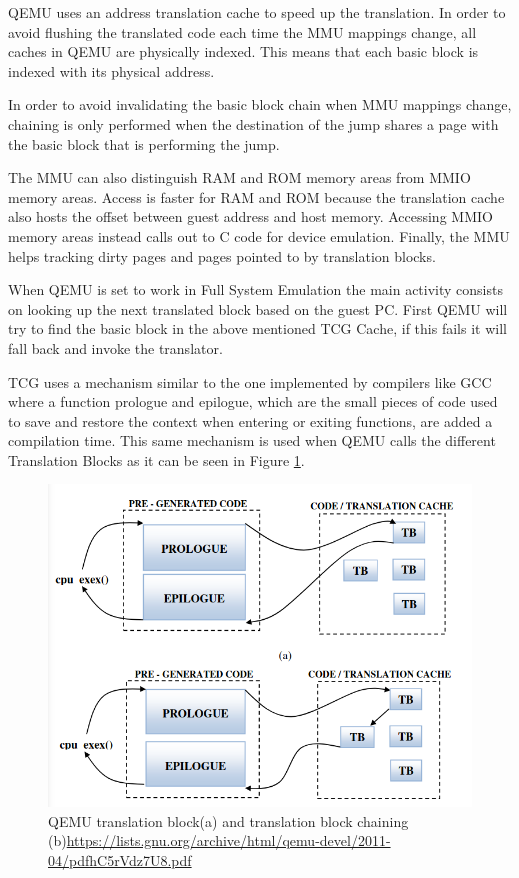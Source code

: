 \begin{itemize}
    QEMU uses an address translation cache to speed up the translation. In order to avoid flushing the translated code each time the MMU mappings change, all caches in QEMU are physically indexed. This means that each basic block is indexed with its physical address.

    In order to avoid invalidating the basic block chain when MMU mappings change, chaining is only performed when the destination of the jump shares a page with the basic block that is performing the jump.

    The MMU can also distinguish RAM and ROM memory areas from MMIO memory areas. Access is faster for RAM and ROM because the translation cache also hosts the offset between guest address and host memory. Accessing MMIO memory areas instead calls out to C code for device emulation. Finally, the MMU helps tracking dirty pages and pages pointed to by translation blocks.

\end{itemize}

When QEMU is set to work in Full System Emulation the main activity consists on looking up the next translated block based on the guest PC. First QEMU will try to find the basic block in the above mentioned TCG Cache, if this fails it will fall back and invoke the translator. 

TCG uses a mechanism similar to the one implemented by compilers like GCC where a function prologue and epilogue, which are the small pieces of code used to save and restore the context when entering or exiting functions, are added a compilation time. This same mechanism is used when QEMU calls the different Translation Blocks as it can be seen in Figure \ref{fig:qemutbc}.  

\begin{figure}[htp]
\centering
\includegraphics[width=\linewidth]{images/qemutbc.png}
\caption{QEMU translation block(a) and translation block chaining (b)\newline\url{https://lists.gnu.org/archive/html/qemu-devel/2011-04/pdfhC5rVdz7U8.pdf}}
\label{fig:qemutbc}
\end{figure}

